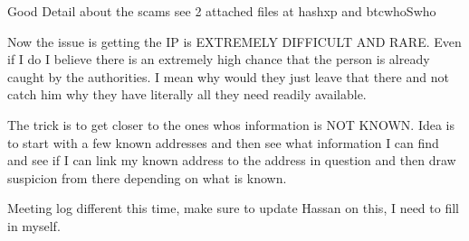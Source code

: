 \documentclass{article}
\begin{document}
            Good Detail about the scams see 2 attached files at hashxp and btcwhoSwho 
            
            Now the issue is getting the IP is EXTREMELY DIFFICULT AND RARE. Even if I do I believe there is an extremely high chance that the person is already caught by the authorities. I mean why would they just leave that there and not catch him why they have literally all they need readily available. 
            
            The trick is to get closer to the ones whos information is NOT KNOWN. Idea is to start with a few known addresses and then see what information I can find and see if I can link my known address to the address in question and then draw suspicion from there depending on what is known.
            
            Meeting log different this time, make sure to update Hassan on this, I need to fill in myself.

\pagebreak

 
\end{document}
